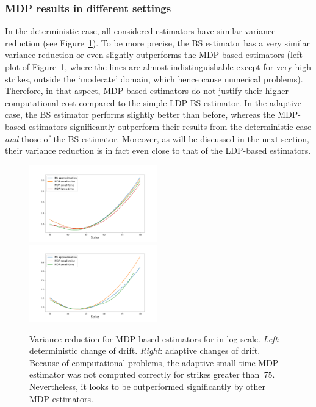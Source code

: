 \subsubsection{MDP results in different settings}

In the deterministic case, all considered estimators have similar variance reduction (see Figure~\ref{fig:MDPvarianceRedu}). 
To be more precise, the BS estimator has a very similar variance reduction or even slightly outperforms the MDP-based estimators (left plot of Figure~\ref{fig:MDPvarianceRedu}, where the lines are almost indistinguishable except for very high strikes, outside the `moderate' domain, which hence cause numerical problems). Therefore, in that aspect, MDP-based estimators do not justify their higher computational cost compared to the simple LDP-BS estimator. In the adaptive case, the BS estimator performs slightly better than before, whereas the MDP-based estimators significantly outperform their results from the deterministic case \textit{and} those of the BS estimator. Moreover, as will be discussed in the next section, their variance reduction is in fact even close to that of the LDP-based estimators.
\begin{figure}[H]
    \centering
    \includegraphics[width=0.495\textwidth, trim={2cm 0.5cm 2cm 1cm }]{content/reschap3/Figures/HESTON/compare-mdp-new.pdf}
    \includegraphics[width=0.495\textwidth, trim={2cm 0.5cm 2cm 1cm }]{content/reschap3/Figures/HESTON/compare-mdpada1-new.pdf}
    \caption{Variance reduction for MDP-based estimators for in log-scale. \textit{Left}: deterministic change of drift. \textit{Right}: adaptive changes of drift. Because of computational problems, the adaptive small-time MDP estimator was not computed correctly for strikes greater than~$75$. Nevertheless, it looks to be outperformed significantly by other MDP estimators.}\label{fig:MDPvarianceRedu}
\end{figure}

